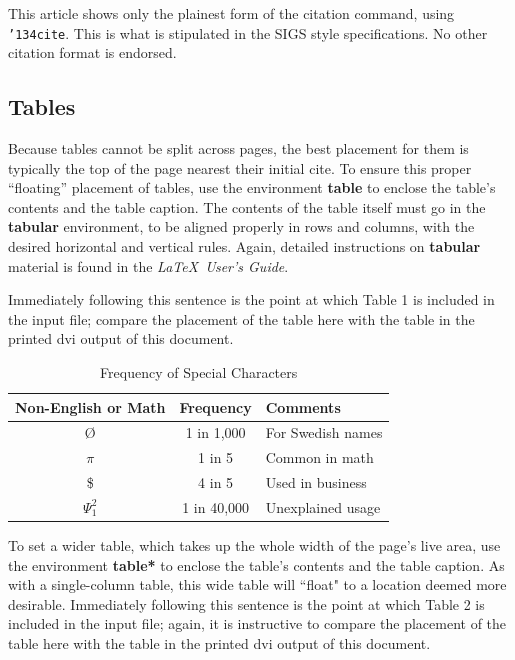 \documentclass{edm_article}
\begin{document}
This article shows only the plainest form
of the citation command, using \texttt{{\char'134}cite}.
This is what is stipulated in the SIGS style specifications.
No other citation format is endorsed.

\subsection{Tables}
Because tables cannot be split across pages, the best
placement for them is typically the top of the page
nearest their initial cite.  To
ensure this proper ``floating'' placement of tables, use the
environment \textbf{table} to enclose the table's contents and
the table caption.  The contents of the table itself must go
in the \textbf{tabular} environment, to
be aligned properly in rows and columns, with the desired
horizontal and vertical rules.  Again, detailed instructions
on \textbf{tabular} material
is found in the \textit{\LaTeX\ User's Guide}.

Immediately following this sentence is the point at which
Table 1 is included in the input file; compare the
placement of the table here with the table in the printed
dvi output of this document.

\begin{table}
\centering
\renewcommand{\arraystretch}{1.2}  %
\caption{Frequency of Special Characters}
\begin{tabular}{ccl} \hline
Non-English or Math&Frequency&Comments\\ \hline
\O & 1 in 1,000& For Swedish names\\
$\pi$ & 1 in 5& Common in math\\
\$ & 4 in 5 & Used in business\\
$\Psi^2_1$ & 1 in 40,000& Unexplained usage\\
\hline\end{tabular}
\end{table}

To set a wider table, which takes up the whole width of
the page's live area, use the environment
\textbf{table*} to enclose the table's contents and
the table caption.  As with a single-column table, this wide
table will ``float" to a location deemed more desirable.
Immediately following this sentence is the point at which
Table 2 is included in the input file; again, it is
instructive to compare the placement of the
table here with the table in the printed dvi
output of this document.
\end{document}
